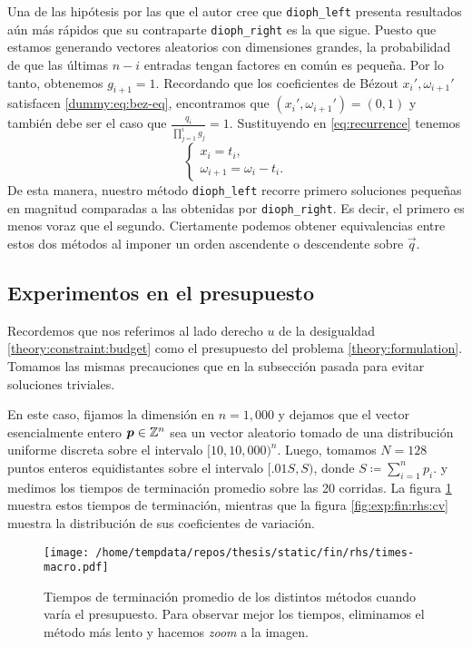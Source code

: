 Una de las hipótesis por las que el autor cree que \texttt{dioph\_left} presenta resultados aún más
rápidos que su contraparte \texttt{dioph\_right} es la que sigue. Puesto que estamos generando
vectores aleatorios con dimensiones grandes, la probabilidad de que las últimas $n - i$ entradas
tengan factores en común es pequeña. Por lo tanto, obtenemos $g_{i+1} = 1$. Recordando que los
coeficientes de Bézout $x_i', \omega_{i+1}'$ satisfacen \eqref{dummy:eq:bez-eq}, encontramos que
$(x_i', \omega_{i + 1}') = (0, 1)$ y también debe ser el caso que $\frac{q_i}{\prod_{j=1}^ig_j} =
1$. Sustituyendo en \eqref{eq:recurrence} tenemos
\begin{equation*}
	\begin{cases}
		x_i = t_i, \\
		\omega_{i + 1} = \omega_i - t_i.
	\end{cases}
\end{equation*}
De esta manera, nuestro método \texttt{dioph\_left} recorre primero soluciones pequeñas en magnitud
comparadas a las obtenidas por \texttt{dioph\_right}. Es decir, el primero es menos voraz que el
segundo. Ciertamente podemos obtener equivalencias entre estos dos métodos al imponer un orden
ascendente o descendente sobre $\vec{q}$.


\subsection{Experimentos en el presupuesto}
\label{subsec:exp:fin:rhs}
\noindent
Recordemos que nos referimos al lado derecho $u$ de la desigualdad \eqref{theory:constraint:budget}
como el presupuesto del problema \eqref{theory:formulation}. Tomamos las mismas precauciones que en
la subsección pasada para evitar soluciones triviales.

En este caso, fijamos la dimensión en $n = 1{,}000$ y dejamos que el vector esencialmente entero
$\boldsymbol{p} \in \mathbb{Z}^n$ sea un vector aleatorio tomado de una distribución uniforme discreta sobre el
intervalo $[10, 10{,}000)^n$. Luego, tomamos $N = 128$ puntos enteros equidistantes sobre el intervalo
$[.01S, S)$, donde $S \coloneq \sum_{i=1}^np_i$. y medimos los tiempos de terminación promedio sobre
las 20 corridas. La figura \ref{fig:exp:fin:rhs:zoom} muestra estos tiempos de terminación, mientras que
la figura \ref{fig:exp:fin:rhs:cv} muestra la distribución de sus coeficientes de variación.

\begin{figure}[hbtp]
	\centering
	\texttt{[image: /home/tempdata/repos/thesis/static/fin/rhs/times-macro.pdf]}
	\caption{Tiempos de terminación promedio de los distintos métodos cuando varía el presupuesto.
		Para observar mejor los tiempos, eliminamos el método más lento y hacemos \textit{zoom} a la
		imagen.}
	\label{fig:exp:fin:rhs:zoom}
\end{figure}

